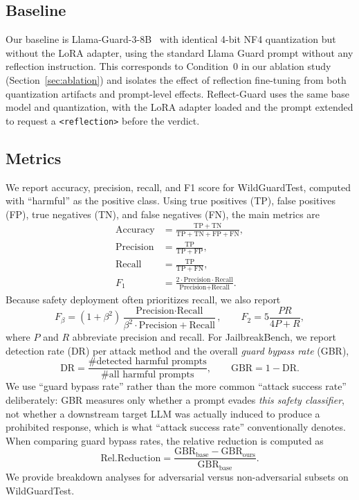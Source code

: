 \documentclass[Superintelligence,article,submit,pdftex,moreauthors]{Definitions/mdpi}
\begin{document}
\subsection{Baseline}

Our baseline is Llama-Guard-3-8B~\citep{metallamaguard3} with identical 4-bit NF4 quantization but without the LoRA adapter, using the standard Llama Guard prompt without any reflection instruction. This corresponds to Condition~0 in our ablation study (Section~\ref{sec:ablation}) and isolates the effect of reflection fine-tuning from both quantization artifacts and prompt-level effects. Reflect-Guard uses the same base model and quantization, with the LoRA adapter loaded and the prompt extended to request a \texttt{<reflection>} before the verdict.

\subsection{Metrics}
\label{sec:metrics}

We report accuracy, precision, recall, and F1 score for WildGuardTest, computed with ``harmful'' as the positive class. Using true positives (TP), false positives (FP), true negatives (TN), and false negatives (FN), the main metrics are
\begin{align}
  \text{Accuracy} &= \frac{\mathrm{TP}+\mathrm{TN}}{\mathrm{TP}+\mathrm{TN}+\mathrm{FP}+\mathrm{FN}}, \\
  \text{Precision} &= \frac{\mathrm{TP}}{\mathrm{TP}+\mathrm{FP}}, \\
  \text{Recall} &= \frac{\mathrm{TP}}{\mathrm{TP}+\mathrm{FN}}, \\
  F_{1} &= \frac{2 \cdot \text{Precision} \cdot \text{Recall}}{\text{Precision}+\text{Recall}}.
\end{align}
Because safety deployment often prioritizes recall, we also report
\begin{equation}
  F_{\beta} = (1+\beta^2)\frac{\text{Precision} \cdot \text{Recall}}{\beta^2 \cdot \text{Precision} + \text{Recall}},
  \qquad F_2 = 5\frac{PR}{4P + R},
\end{equation}
where $P$ and $R$ abbreviate precision and recall. For JailbreakBench, we report detection rate (DR) per attack method and the overall \emph{guard bypass rate} (GBR),
\begin{equation}
  \mathrm{DR} = \frac{\#\text{detected harmful prompts}}{\#\text{all harmful prompts}},
  \qquad
  \mathrm{GBR} = 1 - \mathrm{DR}.
\end{equation}
We use ``guard bypass rate'' rather than the more common ``attack success rate'' deliberately: GBR measures only whether a prompt evades \emph{this safety classifier}, not whether a downstream target LLM was actually induced to produce a prohibited response, which is what ``attack success rate'' conventionally denotes. When comparing guard bypass rates, the relative reduction is computed as
\begin{equation}
  \mathrm{Rel.Reduction} = \frac{\mathrm{GBR}_{\text{base}} - \mathrm{GBR}_{\text{ours}}}{\mathrm{GBR}_{\text{base}}}.
\end{equation}
We provide breakdown analyses for adversarial versus non-adversarial subsets on WildGuardTest.
\end{document}
